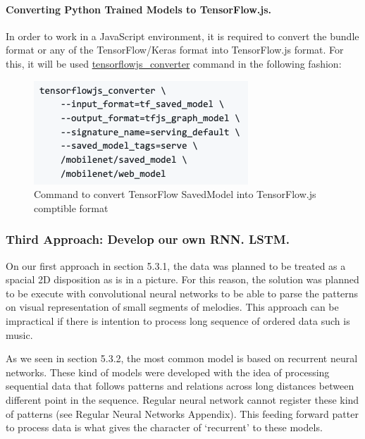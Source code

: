 \paragraph{Converting Python Trained Models to TensorFlow.js.} In order to work in a JavaScript
environment, it is required to convert the bundle format or any of the TensorFlow/Keras
format into TensorFlow.js format. For this, it will be used \url{tensorflowjs_converter}
command in the following fashion:

\begin{figure}[h!]
  \includegraphics[width=\linewidth]{image/fig_JDF10.png}
  \caption{Command to convert TensorFlow SavedModel into TensorFlow.js comptible format}
\end{figure}

\subsubsection{Third Approach: Develop our own RNN. LSTM.}

On our first approach in section 5.3.1, the data was planned to be treated as a spacial
2D disposition as is in a picture. For this reason, the solution was planned to be
execute with convolutional neural networks to be able to parse the patterns on visual
representation of small segments of melodies. This approach can be impractical if
there is intention to process long sequence of ordered data such is music.

As we seen in section 5.3.2, the most common model is based on recurrent neural
networks. These kind of models were developed with the idea of processing sequential
data that follows patterns and relations across long distances between different point
in the sequence. Regular neural network cannot register these kind of patterns (see
Regular Neural Networks Appendix). This feeding forward patter to process data is
what gives the character of ‘recurrent’ to these models.

